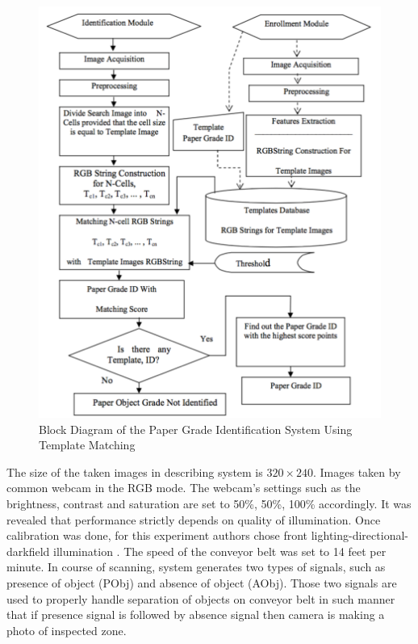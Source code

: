 \documentclass{lutmscthesis}[2010/09/22]
\begin{document}
\begin{figure}[htp]
  {\par\centering
  \includegraphics[width=1\textwidth]{tempmatch}
  \par}
  \caption{Block Diagram of the Paper Grade Identification
          System Using Template Matching~\cite{Rahman2009matching}}
  \label{afig:tempmatch}
\end{figure}

The size of the taken images in describing system is $320\times240$. Images
taken by common webcam in the RGB mode. The webcam's settings such as
the brightness, contrast and saturation are set to 50\%, 50\%, 100\%
accordingly. It was revealed that performance strictly depends on
quality of illumination. Once calibration was done, for this
experiment authors chose front lighting-directional-darkfield
illumination \cite{Pham:2003}. The speed of the conveyor belt
was set to 14 feet per minute. In course of scanning, system
generates two types of signals, such as presence of object (PObj) and
absence of object (AObj). Those two signals are used to properly
handle separation of objects on conveyor belt in such manner that if presence
signal is followed by absence signal then camera is making a photo
of inspected zone.
\end{document}
